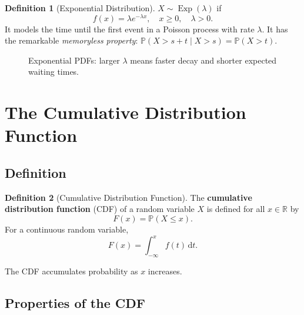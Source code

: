\documentclass[12pt, a4paper, oneside]{book}
\theoremstyle{definition}
\newtheorem{definition}{Definition}[section]
\theoremstyle{plain}
\theoremstyle{remark}
\newcommand{\Prob}{\mathbb{P}}
\newcommand{\R}{\mathbb{R}}
\begin{document}
\begin{definition}[Exponential Distribution]
$X \sim \operatorname{Exp}(\lambda)$ if
\[
  f(x) = \lambda e^{-\lambda x}, \quad x \ge 0,\quad \lambda > 0.
\]
It models the time until the first event in a Poisson process with rate
$\lambda$.  It has the remarkable \emph{memoryless property}:
$\Prob(X > s+t \mid X > s) = \Prob(X > t)$.
\end{definition}

\begin{figure}[h]
\centering
{}
\caption{Exponential PDFs: larger $\lambda$ means faster decay and shorter
expected waiting times.}
\label{fig:exp-pdf}
\end{figure}

\section{The Cumulative Distribution Function}
\label{sec:cdf}

\subsection{Definition}

\begin{definition}[Cumulative Distribution Function]
The \textbf{cumulative distribution function} (CDF) of a random variable $X$
is defined for all $x \in \R$ by
\[
  F(x) = \Prob(X \le x).
\]
For a continuous random variable,
\[
  F(x) = \int_{-\infty}^{x} f(t)\,\mathrm{d}t.
\]
\end{definition}

The CDF accumulates probability as $x$ increases.

\subsection{Properties of the CDF}
\end{document}
